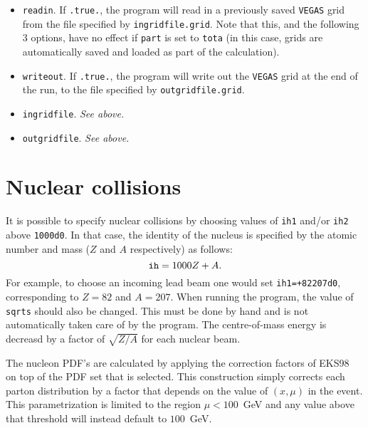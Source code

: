 \documentclass[12pt]{article}
\begin{document}
\begin{itemize}
\begin{center}
\{blank line\} \\
{\tt [How to resume/save a run] }
\end{center}

\item {\tt readin}. If {\tt .true.}, the program will read in a
previously saved {\tt VEGAS} grid from the file specified by
{\tt ingridfile.grid}. Note that this, and the following 3 options,
have no effect if {\tt part} is set to {\tt tota} (in this case, grids
are automatically saved and loaded as part of the calculation).

\item {\tt writeout}. If {\tt .true.}, the program will write out
the {\tt VEGAS} grid at the end of the run, to the file specified by
{\tt outgridfile.grid}.

\item {\tt ingridfile}.  {\it See above.}

\item {\tt outgridfile}.  {\it See above.}

\end{itemize}

\section{Nuclear collisions}
\label{sec:nucleus}

It is possible to specify nuclear collisions by choosing values
of {\tt ih1} and/or {\tt ih2} above {\tt 1000d0}. In that case,
the identity of the nucleus is specified by the atomic number
and mass ($Z$ and $A$ respectively) as follows:
\begin{equation}
{\tt ih} = 1000Z+A.
\end{equation}
For example, to choose an incoming lead beam one would set
{\tt ih1=+82207d0}, corresponding to $Z=82$ and $A=207$.
When running the program, the value of {\tt sqrts} should also be
changed. This must be done by hand and is not automatically taken
care of by the
program. The centre-of-mass energy is decreasd by a factor of
$\sqrt{Z/A}$ for each nuclear beam. 

The nucleon PDF's are calculated by applying the correction
factors of EKS98~\cite{Eskola:1998df} on top of the PDF set that is selected.
This construction simply corrects each parton distribution by
a factor that depends on the value of $(x,\mu)$ in the event.
This parametrization is limited to the region $\mu < 100$~GeV and
any value above that threshold will instead default to $100$~GeV.
\end{document}
